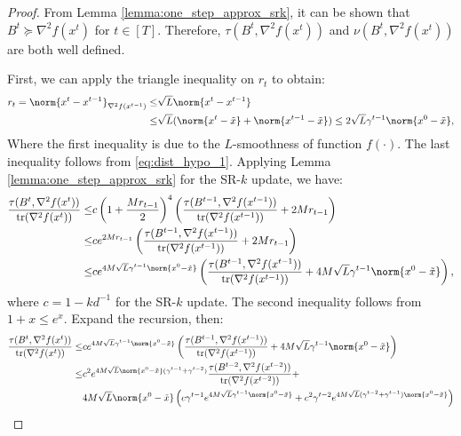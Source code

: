 \begin{proof}
    From Lemma \ref{lemma:one_step_approx_srk}, it can be shown that $B^t \succeq \nabla^2 f(x^t)$ for $t \in [T]$. Therefore, $\tau(B^t, \nabla^2 f(x^t))$ and $\nu(B^t, \nabla^2 f(x^t))$ are both well defined.

    First, we can apply the triangle inequality on $r_t$ to obtain:
    \begin{align*}
        r_t = \norm{x^t - x^{t-1}}_{\nabla^2 f(x^{t-1})} \leq & \sqrt{L} \norm{x^t - x^{t-1}} \\
        \leq & \sqrt{L}(\norm{x^t - \Tilde{x}} + \norm{x^{t-1} - \Tilde{x}}) \leq 2 \sqrt{L} \gamma^{t-1} \norm{x^0 - \Tilde{x}},
    \end{align*}
    Where the first inequality is due to the $L$-smoothness of function $f(\cdot)$. The last inequality follows from \eqref{eq:dist_hypo_1}. 
    Applying Lemma \ref{lemma:one_step_approx_srk} for the SR-$k$ update, we have:
    \begin{align*}
         \frac{\tau(B^{t}, \nabla^2 f(x^{t}))}{\mathrm{tr}(\nabla^2 f(x^{t}))} \leq & c\left(1 + \frac{M r_{t-1}}{2}\right)^4 \left(\frac{\tau (B^{t-1}, \nabla^2 f(x^{t-1}))}{\mathrm{tr}(\nabla^2 f(x^{t-1}))} + 2 M r_{t-1}  \right) \\
         \leq & c e^ {2 M r_{t-1}} \left(\frac{\tau (B^{t-1}, \nabla^2 f(x^{t-1}))}{\mathrm{tr}(\nabla^2 f(x^{t-1}))} + 2 M r_{t-1}  \right)\\
         \leq & c e^ {4 M \sqrt{L} \gamma^{t-1} \norm{x^0 - \Tilde{x}}} \left(\frac{\tau (B^{t-1}, \nabla^2 f(x^{t-1}))}{\mathrm{tr}(\nabla^2 f(x^{t-1}))} + 4 M \sqrt{L} \gamma^{t-1} \norm{x^0 - \Tilde{x}}  \right),
    \end{align*}
    where $c = 1 - k d^{-1}$ for the SR-$k$ update.
    The second inequality follows from $1 + x \leq e^x$. Expand the recursion, then:
    \begin{align*}
         \frac{\tau(B^{t}, \nabla^2 f(x^{t}))}{\mathrm{tr}(\nabla^2 f(x^{t}))} \leq & c e^ {4 M \sqrt{L} \gamma^{t-1} \norm{x^0 - \Tilde{x}}} \left(\frac{\tau (B^{t-1}, \nabla^2 f(x^{t-1}))}{\mathrm{tr}(\nabla^2 f(x^{t-1}))} + 4 M \sqrt{L} \gamma^{t-1} \norm{x^0 - \Tilde{x}}  \right) \\
         \leq & c^2 e^ {4 M \sqrt{L}  \norm{x^0 - \Tilde{x}} (\gamma^{t-1} + \gamma^{t-2})} \frac{\tau (B^{t-2}, \nabla^2 f(x^{t-2}))}{\mathrm{tr}(\nabla^2 f(x^{t-2}))} + \\
         & 4 M \sqrt{L}  \norm{x^0 - \Tilde{x}}\left( c \gamma^{t-1} e^ {4 M \sqrt{L} \gamma^{t-1} \norm{x^0 - \Tilde{x}}} + c^2 \gamma^{t-2} e^ {4 M \sqrt{L} (\gamma^{t-2} + \gamma^{t-1}) \norm{x^0 - \Tilde{x}}} \right)  \\

\end{align*}
\end{proof}
